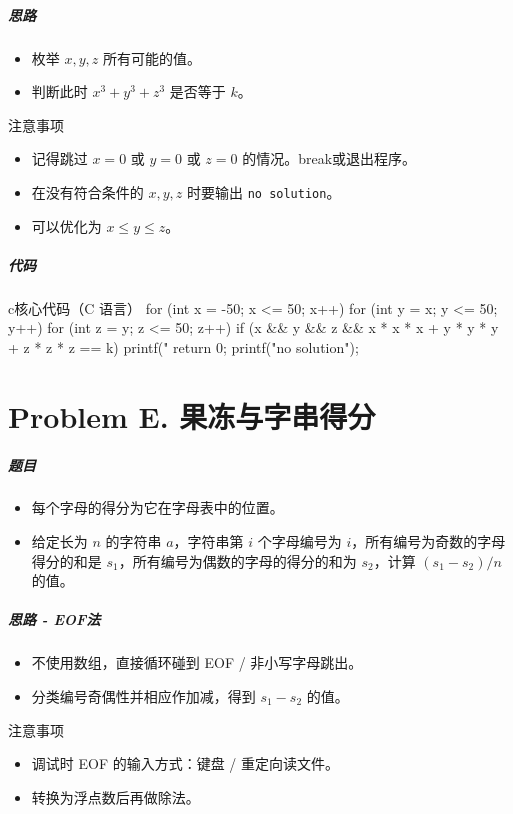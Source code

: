 \documentclass[
     aspectratio=169,                   %
]{beamer}
\begin{document}
\begin{frame}
	\frametitle{思路}
	\begin{itemize}
		\item 枚举 $x,y,z$ 所有可能的值。
		\item 判断此时 $x^3+y^3+z^3$ 是否等于 $k$。
	\end{itemize}
	\begin{alertblock}{注意事项}
		\begin{itemize}
			\item 记得跳过 $x=0$ 或 $y=0$ 或 $z=0$ 的情况。break或退出程序。
			\item 在没有符合条件的 $x,y,z$ 时要输出 \lstinline|no solution|。
			\item 可以优化为 $x\le y\le z$。
		\end{itemize}
	\end{alertblock}
\end{frame}

\begin{frame}[fragile]
	\frametitle{代码}
	\begin{codeblock}{c}{核心代码（C 语言）}
for (int x = -50; x <= 50; x++) {
    for (int y = x; y <= 50; y++) {
        for (int z = y; z <= 50; z++) {
            if (x && y && z && x * x * x + y * y * y + z * z * z == k) {
                printf("%
                return 0;
            }
        }
    }
}
printf("no solution");
\end{codeblock}
\end{frame}


\part{Problem E. 果冻与字串得分}
\begin{frame}
	\frametitle{题目}
	\begin{itemize}
		\item 每个字母的得分为它在字母表中的位置。
		\item 给定长为 $n$ 的字符串 $a$，字符串第 $i$ 个字母编号为 $i$，所有编号为奇数的字母得分的和是 $s_1$，所有编号为偶数的字母的得分的和为 $s_2$，计算 $(s_1-s_2)/n$ 的值。
	\end{itemize}
\end{frame}

\begin{frame}
	\frametitle{思路 - EOF法}
	\begin{itemize}
		\item 不使用数组，直接循环碰到 EOF / 非小写字母跳出。
		\item 分类编号奇偶性并相应作加减，得到 $s_1-s_2$ 的值。
	\end{itemize}
	\begin{alertblock}{注意事项}
		\begin{itemize}
			\item 调试时 EOF 的输入方式：键盘 / 重定向读文件。
			\item 转换为浮点数后再做除法。
		\end{itemize}
	\end{alertblock}
\end{frame}
\end{document}
